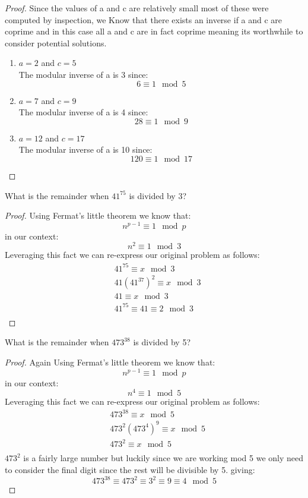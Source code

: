 \documentclass[11pt]{article}
\theoremstyle{definition}  %
\newcommand{\block}[2]{\begin{tcolorbox}[title={#1}]{#2}\end{tcolorbox}}
\begin{document}
\begin{proof}
Since the values of a and c are relatively small most of these were computed by inspection, we Know that there exists an inverse if a and c are coprime and in this case all a and c are in fact coprime meaning its worthwhile to consider potential solutions.
\begin{enumerate}
  \item $a=2$ and $c=5$\\
  The modular inverse of a is 3 since:
  \[
    6\equiv 1\mod 5
  \]
  \item $a=7$ and $c=9$\\
  The modular inverse of a is 4 since:
  \[
    28\equiv 1\mod 9
  \]
  \item $a=12$ and $c=17$\\

  The modular inverse of a is 10 since:
  \[
    120\equiv 1\mod17
  \]
\end{enumerate}
\end{proof}
\block{Andrews 5.2.5}{
What is the remainder when $41^{75}$ is divided by 3?
}
\begin{proof}
Using Fermat's little theorem we know that:
\[
  n^{p-1}\equiv 1\mod p
\]
in our context:
\[
  n^2\equiv 1 \mod 3
\]
Leveraging this fact we can re-express our original problem as follows:
\begin{align*}
  &41^{75}\equiv x \mod 3\\
  &41(41^{37})^2\equiv x \mod 3\\
  &41\equiv x \mod 3 \\
  &41^{75}\equiv41\equiv 2 \mod 3 \\
\end{align*}

\end{proof}
\block{Andrews 5.2.6}{
What is the remainder when $473^{38}$ is divided by 5?
}
\begin{proof}
  Again Using Fermat's little theorem we know that:
  \[
    n^{p-1}\equiv 1\mod p
  \]
  in our context:
  \[
    n^4\equiv 1 \mod 5
  \]
  Leveraging this fact we can re-express our original problem as follows:
  \begin{align*}
    &473^{38}\equiv x \mod 5\\
    &473^{2}(473^{4})^9\equiv x \mod 5\\
    &473^{2}\equiv x \mod 5 \\
  \end{align*}
  $473^2$ is a fairly large number but luckily since we are working mod 5 we only need to consider the final digit since the rest will be divisible by 5. giving:
  \[
    473^{38}\equiv 473^{2}\equiv 3^2 \equiv9\equiv 4 \mod 5
  \]
\end{proof}
\end{document}
